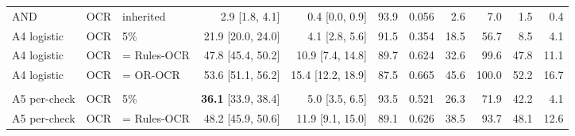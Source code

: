 \documentclass[12pt]{article}
\begin{document}
\begin{table}[H]
\begin{adjustbox}{max width=\linewidth}
\begin{tabular}{@{}l l l r r r c r r r r@{}}
\quad AND & OCR & inherited & 2.9 {\tiny[1.8, 4.1]} & 0.4 {\tiny[0.0, 0.9]} & 93.9 & 0.056 & 2.6 & 7.0 & 1.5 & 0.4 \\
\quad A4 logistic & OCR & 5\% & 21.9 {\tiny[20.0, 24.0]} & 4.1 {\tiny[2.8, 5.6]} & 91.5 & 0.354 & 18.5 & 56.7 & 8.5 & 4.1 \\
\quad A4 logistic & OCR & = Rules-OCR & 47.8 {\tiny[45.4, 50.2]} & 10.9 {\tiny[7.4, 14.8]} & 89.7 & 0.624 & 32.6 & 99.6 & 47.8 & 11.1 \\
\quad A4 logistic & OCR & = OR-OCR & 53.6 {\tiny[51.1, 56.2]} & 15.4 {\tiny[12.2, 18.9]} & 87.5 & 0.665 & 45.6 & 100.0 & 52.2 & 16.7 \\
\addlinespace[4pt]
\multicolumn{11}{@{}l}{\emph{Per-check fusion (post-hoc, \S\ref{subsec:res-a5})}} \\
\quad A5 per-check & OCR & 5\% & \textbf{36.1} {\tiny[33.9, 38.4]} & 5.0 {\tiny[3.5, 6.5]} & 93.5 & 0.521 & 26.3 & 71.9 & 42.2 & 4.1 \\
\quad A5 per-check & OCR & = Rules-OCR & 48.2 {\tiny[45.9, 50.6]} & 11.9 {\tiny[9.1, 15.0]} & 89.1 & 0.626 & 38.5 & 93.7 & 48.1 & 12.6 \\
\bottomrule
\end{tabular}
\end{adjustbox}
\end{table}
\clearpage
\end{document}
